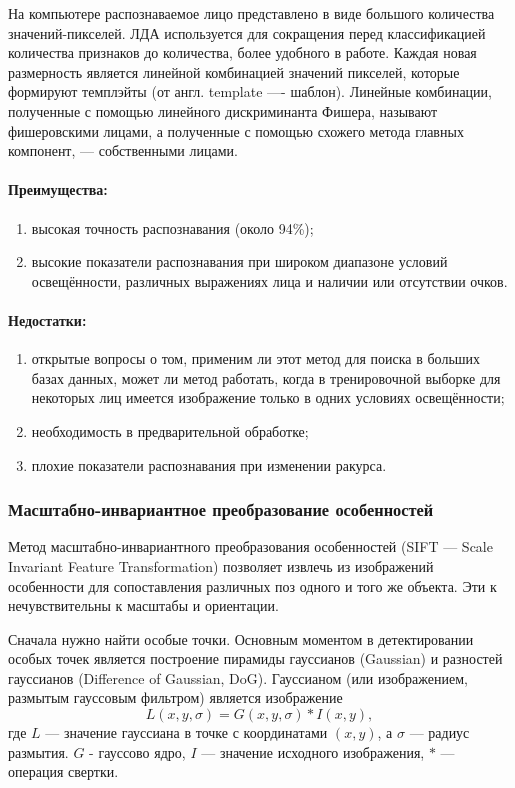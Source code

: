 \documentclass[a4paper,12pt]{report}
\numberwithin{equation}{section}
\begin{document}
На компьютере распознаваемое лицо представлено в виде большого количества
значений-пикселей. ЛДА используется для сокращения перед классификацией
количества признаков до количества, более удобного в работе. Каждая новая
размерность является линейной комбинацией значений пикселей, которые формируют
темплэйты (от англ. template —- шаблон). Линейные комбинации, полученные с
помощью линейного дискриминанта Фишера, называют фишеровскими лицами, а
полученные с помощью схожего метода главных компонент, — собственными лицами.

\paragraph{Преимущества:}
\begin{enumerate}
\item высокая точность распознавания (около 94\%);
\item высокие показатели распознавания при широком диапазоне условий 
освещённости, различных выражениях лица и наличии или отсутствии очков.
\end{enumerate}

\paragraph{Недостатки:}
\begin{enumerate}
\item открытые вопросы о том, применим ли этот метод для поиска в
больших базах данных, может ли метод работать, когда в тренировочной выборке для
некоторых лиц имеется изображение только в одних условиях освещённости;
\item необходимость в предварительной обработке;
\item плохие показатели распознавания при изменении ракурса.
\end{enumerate}

\subsubsection{Масштабно-инвариантное преобразование особенностей} 
Метод масштабно-инвариантного преобразования особенностей (SIFT --- Scale
Invariant Feature Transformation) позволяет извлечь из изображений особенности
для сопоставления различных поз одного и того же объекта. Эти к нечувствительны
к масштабы и ориентации.


Сначала нужно найти особые точки. Основным моментом в детектировании особых
точек является построение пирамиды гауссианов (Gaussian) и разностей гауссианов
(Difference of Gaussian, DoG). Гауссианом (или изображением, размытым гауссовым
фильтром) является изображение
\[ L(x,y,\sigma) = G(x,y,\sigma) \ast I(x,y), \]
где $L$ --- значение гауссиана в точке с координатами $(x,y)$, а $\sigma$ ---
радиус размытия. $G$ - гауссово ядро, $I$ --- значение исходного изображения,
$\ast$ --- операция свертки.
\end{document}

